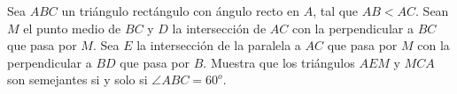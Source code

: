 Sea $ABC$ un triángulo rectángulo con ángulo recto en $A$, tal que $AB\lt AC$. Sean $M$ el punto medio de $BC$ y $D$ la intersección de $AC$ con la perpendicular a $BC$ que pasa por $M$. Sea $E$ la intersección de la paralela a $AC$ que pasa por $M$ con la perpendicular a $BD$ que pasa por $B$. Muestra que los triángulos $AEM$ y $MCA$ son semejantes si y solo si $\angle ABC=60^o$.